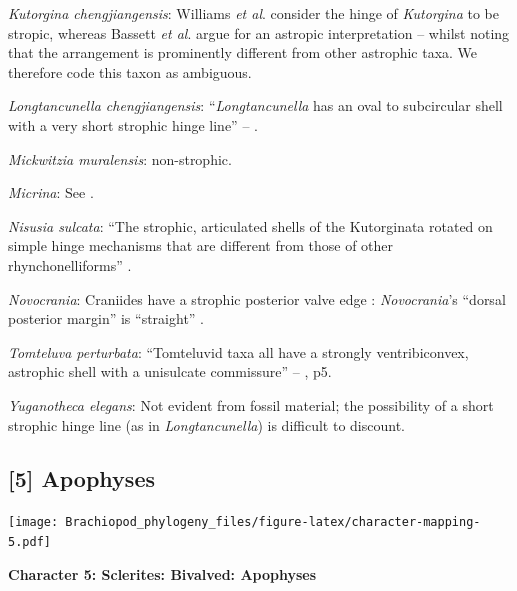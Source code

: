 \documentclass[openany]{book}
\theoremstyle{definition}
\theoremstyle{definition}
\theoremstyle{definition}
\theoremstyle{remark}
\begin{document}
\hypertarget{Kutorgina_chengjiangensis-coding-4}{}
\emph{Kutorgina chengjiangensis}: Williams \emph{et al}.
\citeyearpar[p.~208]{Williams2000LinguliformeaCraniiformea} consider the
hinge of \emph{Kutorgina} to be stropic, whereas Bassett \emph{et al}.
\citeyearpar{Bassett2001Functionalmorphology} argue for an astropic
interpretation -- whilst noting that the arrangement is prominently
different from other astrophic taxa. We therefore code this taxon as
ambiguous.

\hypertarget{Longtancunella_chengjiangensis-coding-4}{}
\emph{Longtancunella chengjiangensis}: ``\emph{Longtancunella} has an
oval to subcircular shell with a very short strophic hinge line'' --
\citet{Zhang2011Theexceptionally}.

\hypertarget{Mickwitzia_muralensis-coding-4}{}
\emph{Mickwitzia muralensis}: non-strophic.

\hypertarget{Micrina-coding-4}{}
\emph{Micrina}: See \citet{Holmer2008TheEarly}.

\hypertarget{Nisusia_sulcata-coding-4}{}
\emph{Nisusia sulcata}: ``The strophic, articulated shells of the
Kutorginata rotated on simple hinge mechanisms that are different from
those of other rhynchonelliforms''
\citep[p.~208]{Williams2000LinguliformeaCraniiformea}.

\hypertarget{Novocrania-coding-4}{}
\emph{Novocrania}: Craniides have a strophic posterior valve edge
\citep[table 39 on p.~2853]{Williams2007Supplement}: \emph{Novocrania}'s
``dorsal posterior margin'' is ``straight''
\citep[p.~171]{Williams2000LinguliformeaCraniiformea}.

\hypertarget{Tomteluva_perturbata-coding-4}{}
\emph{Tomteluva perturbata}: ``Tomteluvid taxa all have a strongly
ventribiconvex, astrophic shell with a unisulcate commissure'' --
\citet{Streng2016Anew}, p5.

\hypertarget{Yuganotheca_elegans-coding-4}{}
\emph{Yuganotheca elegans}: Not evident from fossil material; the
possibility of a short strophic hinge line (as in \emph{Longtancunella})
is difficult to discount.

\subsection*{{[}5{]} Apophyses}\label{apophyses}

\texttt{[image: Brachiopod\_phylogeny\_files/figure-latex/character-mapping-5.pdf]}

\textbf{Character 5: Sclerites: Bivalved: Apophyses}
\end{document}
